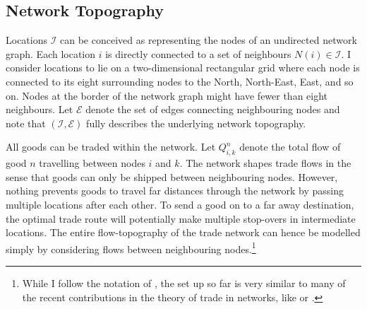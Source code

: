 \documentclass[11pt, oneside]{article}   	%
\begin{document}
\subsection{Network Topography}
Locations $\mathcal{I}$ can be conceived as representing the nodes of an undirected network graph. Each location $i$ is directly connected to a set of neighbours $N(i) \in \mathcal{I}$. I consider locations to lie on a two-dimensional rectangular grid where each node is connected to its eight surrounding nodes to the North, North-East, East, and so on. Nodes at the border of the network graph might have fewer than eight neighbours. Let $\mathcal{E}$ denote the set of edges connecting neighbouring nodes and note that $(\mathcal{I}, \mathcal{E})$ fully describes the underlying network topography.

All goods can be traded within the network. Let $Q_{i,k}^{n}$ denote the total flow of good $n$ travelling between nodes $i$ and $k$. The network shapes trade flows in the sense that goods can only be shipped between neighbouring nodes. However, nothing prevents goods to travel far distances through the network by passing multiple locations after each other. To send a good on to a far away destination, the optimal trade route will potentially make multiple stop-overs in intermediate locations. The entire flow-topography of the trade network can hence be modelled simply by considering flows between neighbouring nodes.\footnote{While I follow the notation of \cite{fajgelbaum_optimal_2017}, the set up so far is very similar to many of the recent contributions in the theory of trade in networks, like \cite{allen_welfare_2016} or \cite{Galichon_OptimalTransportMethods_2016}.}
\end{document}
